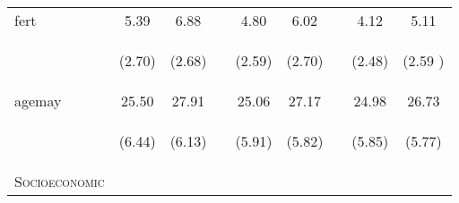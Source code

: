 \documentclass{article}[11pt,subeqn]
\begin{document}
\begin{spacing}{1.5}
\begin{table}[ht]
\begin{center}
\begin{tabular}{lccp{5mm}ccp{5mm}cc}
fert	&	5.39	&	6.88	&	&	4.80	&	6.02	&	&	4.12	&	5.11		\\
\begin{footnotesize}\end{footnotesize}	& \begin{footnotesize} (2.70)\end{footnotesize} & \begin{footnotesize} (2.68)\end{footnotesize} & \begin{footnotesize} 	\end{footnotesize} & \begin{footnotesize} (2.59)\end{footnotesize} & \begin{footnotesize} (2.70)\end{footnotesize} & \begin{footnotesize} 	\end{footnotesize} & \begin{footnotesize} (2.48)\end{footnotesize} & \begin{footnotesize} (2.59	)\end{footnotesize}	\\
agemay	&	25.50	&	27.91	&	&	25.06	&	27.17	&	&	24.98	&	26.73		\\
\begin{footnotesize}\end{footnotesize}	& \begin{footnotesize} (6.44)\end{footnotesize} & \begin{footnotesize} (6.13)\end{footnotesize} & \begin{footnotesize} 	\end{footnotesize} & \begin{footnotesize} (5.91)\end{footnotesize} & \begin{footnotesize} (5.82)\end{footnotesize} & \begin{footnotesize} 	\end{footnotesize} & \begin{footnotesize} (5.85)\end{footnotesize} & \begin{footnotesize} (5.77)\end{footnotesize}	\\
\textsc{Socioeconomic} & & &&&&&& \\																

\end{tabular}
\end{center}
\end{table}
\end{spacing}
\end{document}
